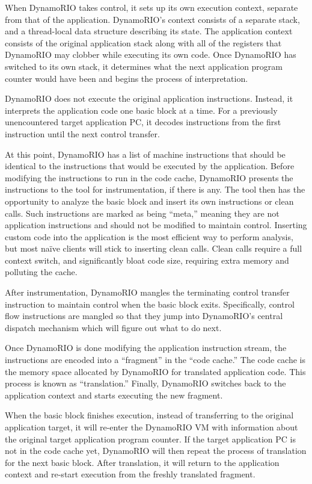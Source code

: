 When DynamoRIO takes control, it sets up its own execution context, separate
from that of the application.  DynamoRIO's context consists of a separate stack,
and a thread-local data structure describing its state.  The application context
consists of the original application stack along with all of the registers that
DynamoRIO may clobber while executing its own code.  Once DynamoRIO has switched
to its own stack, it determines what the next application program counter would
have been and begins the process of interpretation.

DynamoRIO does not execute the original application instructions.  Instead, it
interprets the application code one basic block at a time.  For a previously
unencountered target application PC, it decodes instructions from the first
instruction until the next control transfer.

At this point, DynamoRIO has a list of machine instructions that should be
identical to the instructions that would be executed by the application.
Before modifying the instructions to run in the code cache, DynamoRIO presents
the instructions to the tool for instrumentation, if there is any.  The tool
then has the opportunity to analyze the basic block and insert its own
instructions or clean calls.  Such instructions are marked as being ``meta,''
meaning they are not application instructions and should not be modified to
maintain control.  Inserting custom code into the application is the most
efficient way to perform analysis, but most na\"ive clients will stick to
inserting clean calls.  Clean calls require a full context switch, and
significantly bloat code size, requiring extra memory and polluting the cache.

After instrumentation, DynamoRIO mangles the terminating control transfer
instruction to maintain control when the basic block exits.  Specifically,
control flow instructions are mangled so that they jump into DynamoRIO's
central dispatch mechanism which will figure out what to do next.

Once DynamoRIO is done modifying the application instruction stream, the
instructions are encoded into a ``fragment'' in the ``code cache.'' The code
cache is the memory space allocated by DynamoRIO for translated application
code.  This process is known as ``translation.'' Finally, DynamoRIO switches
back to the application context and starts executing the new fragment.

When the basic block finishes execution, instead of transferring to the
original application target, it will re-enter the DynamoRIO VM with information
about the original target application program counter.  If the target
application PC is not in the code cache yet, DynamoRIO will then repeat the
process of translation for the next basic block.  After translation, it will
return to the application context and re-start execution from the freshly
translated fragment.

